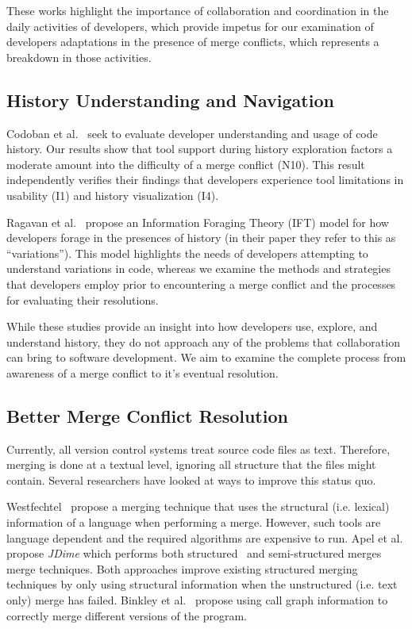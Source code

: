 These works highlight the importance of collaboration and coordination in the daily activities of developers, which provide impetus for our examination of developers adaptations in the presence of merge conflicts, which represents a breakdown in those activities.

\subsection{History Understanding and Navigation}

Codoban et al.~\cite{Mihai_lenses} seek to evaluate developer understanding and usage of code history. 
Our results show that tool support during history exploration factors a moderate amount into the difficulty of a merge conflict (N10). 
This result independently verifies their findings that developers experience tool limitations in usability (I1) and history visualization (I4).

Ragavan et al.~\cite{ragavan_pfis-v_2017} propose an Information Foraging Theory (IFT) model for how developers forage in the presences of history (in their paper they refer to this as ``variations'').
This model highlights the needs of developers attempting to understand variations in code, whereas we examine the methods and strategies that developers employ prior to encountering a merge conflict and the processes for evaluating their resolutions.

While these studies provide an insight into how developers use, explore, and understand history, they do not approach any of the problems that collaboration can bring to software development.
We aim to examine the complete process from awareness of a merge conflict to it's eventual resolution.

\subsection{Better Merge Conflict Resolution}

Currently, all version control systems treat source code files as text.
Therefore, merging is done at a textual level, ignoring all structure that the files might contain.
Several researchers have looked at ways to improve this status quo.

Westfechtel~\cite{westfechtel_structure-oriented_1991} propose a merging technique that uses the structural (i.e. lexical) information of a language when performing a merge. However, such tools are language dependent and the required algorithms are expensive to run.
Apel et al. propose \emph{JDime} which performs both structured~\cite{apel_structured_2012-1} and semi-structured merges~\cite{apel_semistructured_2011} merge techniques.
Both approaches improve existing structured merging techniques by only using structural information when the unstructured (i.e. text only) merge has failed.
Binkley et al.~\cite{binkley_program_1995} propose using call graph information to correctly merge different versions of the program.

